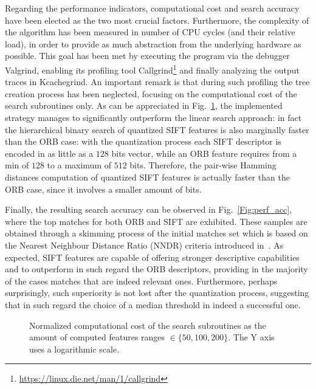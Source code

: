 \documentclass[a4paper, 11pt, oneside]{article}
\newlength\fheight
\newlength\fwidth
\begin{document}
Regarding the performance indicators, computational cost and search accuracy have been elected as the two most crucial factors. Furthermore, the complexity of the algorithm has been measured in number of CPU cycles (and their relative load), in order to provide as much abstraction from the underlying hardware as possible. This goal has been met by executing the program via the debugger Valgrind, enabling its profiling tool Callgrind\footnote{\url{https://linux.die.net/man/1/callgrind}} and finally analyzing the output traces in Kcachegrind. An important remark is that during such profiling the tree creation process has been neglected, focusing on the computational cost of the search subroutines only.
As can be appreciated in Fig.~\ref{Fig:perf_cost}, the implemented strategy manages to significantly outperform the linear search approach: in fact the hierarchical binary search of quantized SIFT features is also marginally faster than the ORB case: with the quantization process each SIFT descriptor is encoded in as little as a $128$ bits vector, while an ORB feature requires from a min of $128$ to a maximum of $512$ bits. Therefore, the pair-wise Hamming distances computation of quantized SIFT features is actually faster than the ORB case, since it involves a smaller amount of bits.


Finally, the resulting search accuracy can be observed in Fig.~\ref{Fig:perf_acc}, where the top matches for both ORB and SIFT are exhibited. These samples are obtained through a skimming process of the initial matches set which is based on the Nearest Neighbour Distance Ratio (NNDR) criteria introduced in~\cite{lowe2004distinctive}. As expected, SIFT features are capable of offering stronger descriptive capabilities and to outperform in such regard the ORB descriptors, providing in the majority of the cases matches that are indeed relevant ones. Furthermore, perhaps surprisingly, such superiority is not lost after the quantization process, suggesting that in such regard the choice of a median threshold in indeed a successful one.

\begin{figure}[h!]
  \centering
  \setlength{}
  \setlength{}
  
  \setlength\belowcaptionskip{-.3cm}
  \captionsetup{justification=centering}
  \caption{Normalized computational cost of the search subroutines as the amount of computed features ranges $\in \{50, 100, 200\}$. The Y axis uses a logarithmic scale.}
  \label{Fig:perf_cost}
\end{figure}
\end{document}
